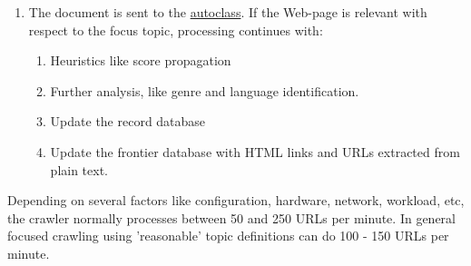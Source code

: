 \begin{enumerate}
\item The document is sent to the \hyperref{topic filter}{topic filter,
(see section }{)}{autoclass}. If the 
Web-page is relevant with respect to the focus topic,
processing continues with:

\begin{enumerate}
\item Heuristics like score propagation


\item Further analysis, like genre and language
  identification.

\item Update the record database %

\item Update the frontier database with HTML links and URLs
  extracted from plain text.%

\end{enumerate}

\end{enumerate}

Depending on several factors like configuration, hardware, network,
workload, etc, the crawler normally processes between 50 and 250
URLs per minute. In general focused crawling using 'reasonable'
topic definitions can do 100 - 150 URLs per minute.

